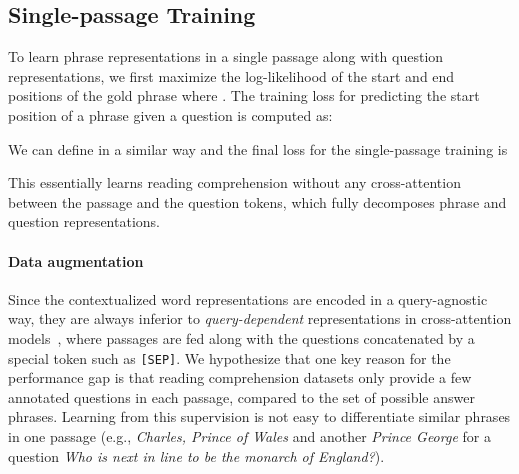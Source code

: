 \documentclass[11pt,a4paper]{article}
\newcommand\ti[1]{\textit{#1}}
\newcommand\ttt[1]{\texttt{#1}}
\begin{document}
\subsection{Single-passage Training}\label{sec:single-passage}
To learn phrase representations in a single passage along with question representations, we first maximize the log-likelihood of the start and end positions of the gold phrase  where .
The training loss for predicting the start position of a phrase given a question is computed as:

We can define  in a similar way and the final loss for the single-passage training is

This essentially learns reading comprehension without any cross-attention between the passage and the question tokens, which fully decomposes phrase and question representations.

\begin{comment}


\paragraph{Differences from DenSPI}
We deviate from DenSPI in the following ways: (1) Previous models split a hidden vector from a pre-trained LM into four vectors (start \& end vectors and two vectors for calculating a coherency score).
We don't do any splitting of vectors and remove the use of coherency scalars.
We find that it is beneficial to keep the output dimension of pre-trained LMs for fully utilizing their representational capacity;
(2) Previous models use a shared encoder for phrases and questions.
However, we use two different language models for representing questions. (3) We use SpanBERT instead of BERT. See Table~\ref{tab:piqa-ablation} for an ablation study.
\end{comment}

\paragraph{Data augmentation}
Since the contextualized word representations  are encoded in a query-agnostic way, they are always inferior to \ti{query-dependent} representations in cross-attention models~\citep{devlin2019bert},  where passages are fed along with the questions concatenated by a special token such as \ttt{[SEP]}.
We hypothesize that one key reason for the performance gap is that reading comprehension datasets only provide a few annotated questions in each passage, compared to the set of possible answer phrases. Learning from this supervision is not easy to differentiate similar phrases in one passage (e.g.,  \textit{Charles, Prince of Wales} and another  \textit{Prince George} for a question  \textit{Who is next in line to be the monarch of England?}).
\end{document}
